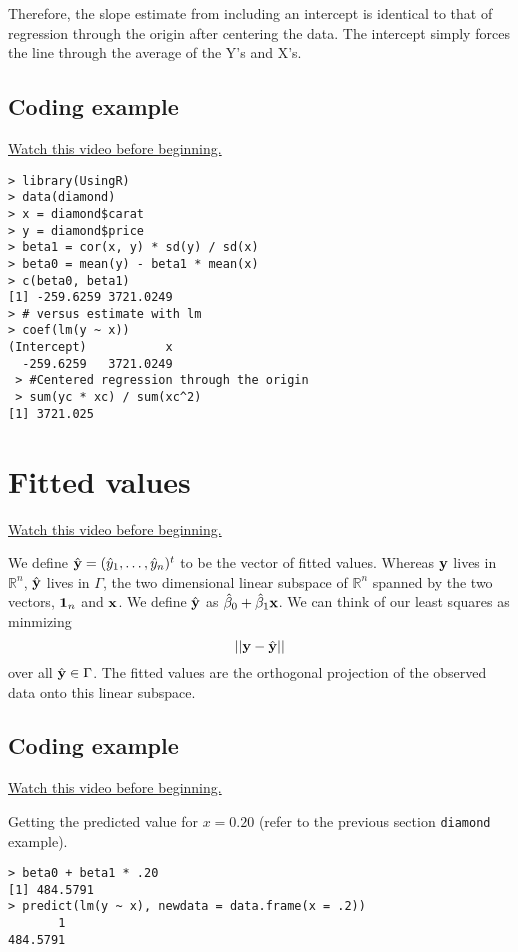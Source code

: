 Therefore, the slope estimate from including an intercept is identical to that of
regression through  the origin after centering the data. The intercept simply
forces the line through the average of the Y's and X's.

\subsection{Coding example}
\href{https://www.youtube.com/watch?v=fLITbjrkQks&list=PLpl-gQkQivXhdgUCdaUQcdb31CRe8Mm2y&index=15}{Watch this video before beginning.}

\begin{verbatim}
> library(UsingR)
> data(diamond)
> x = diamond$carat
> y = diamond$price
> beta1 = cor(x, y) * sd(y) / sd(x)
> beta0 = mean(y) - beta1 * mean(x)
> c(beta0, beta1)
[1] -259.6259 3721.0249
> # versus estimate with lm
> coef(lm(y ~ x))
(Intercept)           x 
  -259.6259   3721.0249 
 > #Centered regression through the origin
 > sum(yc * xc) / sum(xc^2)
[1] 3721.025
\end{verbatim}

\section{Fitted values}
\href{https://www.youtube.com/watch?v=QwYzfLOAQbo&index=16&list=PLpl-gQkQivXhdgUCdaUQcdb31CRe8Mm2y}{Watch this video before beginning.}

We define $\hat {\mathbf{y}} = (\hat y_1, \ldots, \hat y_n)^t$ to be the vector of fitted values.
Whereas $\mathbf{y}$ lives in $\mathbb{R}^n$, $\hat {\mathbf{y}}$ lives in $\Gamma$, the two dimensional
linear subspace of $\mathbb{R}^n$ spanned by the two vectors, $\mathbf{1}_n$ and $\mathbf{x}$. We
define $\hat {\mathbf{y}}$ as $\hat \beta_0 + \hat \beta_1 \mathbf{x}$. We can think of our
least squares as minmizing 
$$
|| \mathbf{y} - \hat {\mathbf{y}}|| 
$$
over all $\hat {\mathbf{y}} \in \Gamma$. The fitted values are the orthogonal projection
of the observed data onto this linear subspace.

\subsection{Coding example}
\href{https://www.youtube.com/watch?v=sFbhaImWA7c&index=17&list=PLpl-gQkQivXhdgUCdaUQcdb31CRe8Mm2y}{Watch this video before beginning.}

Getting the predicted value for $x=0.20$ (refer to the previous section \texttt{diamond} example). 
\begin{verbatim}
> beta0 + beta1 * .20
[1] 484.5791
> predict(lm(y ~ x), newdata = data.frame(x = .2))
       1 
484.5791 
\end{verbatim}

